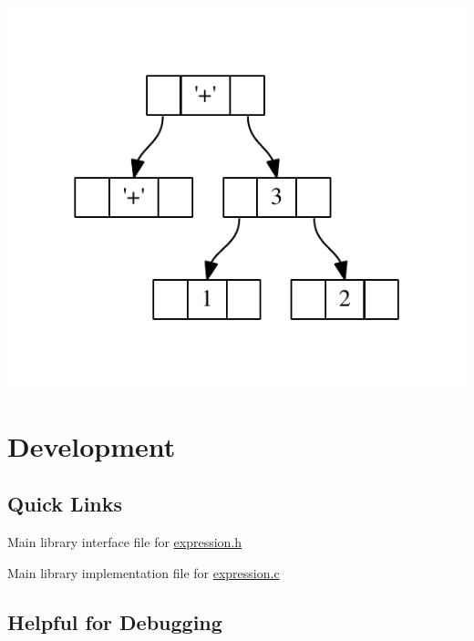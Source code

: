 \begin{center}

\begin{DoxyImageNoCaption}
  \mbox{\includegraphics[width=\textwidth,height=\textheight/2,keepaspectratio=true]{dot_inline_dotgraph_3}}
\end{DoxyImageNoCaption}
\end{center}
\hypertarget{index_development}{}\section{Development}\label{index_development}
\hypertarget{index_quick_links}{}\subsection{Quick Links}\label{index_quick_links}

\begin{DoxyItemize}
\item Main library interface file for \hyperlink{expression_8h}{expression.\+h}
\item Main library implementation file for \hyperlink{expression_8c}{expression.\+c}
\end{DoxyItemize}\hypertarget{index_debug_info}{}\subsection{Helpful for Debugging}\label{index_debug_info}

